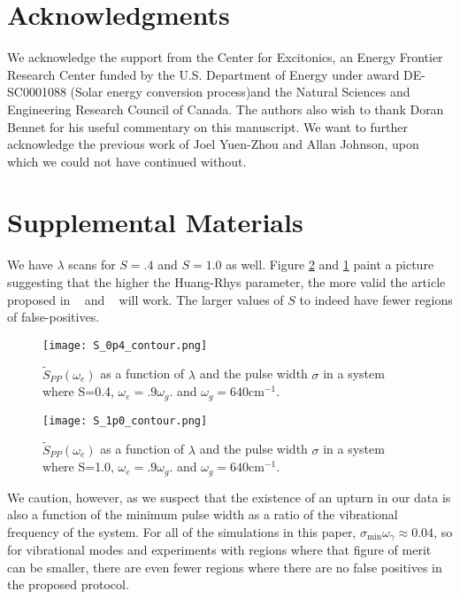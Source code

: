 


\section{Acknowledgments}
We acknowledge the support from the Center for Excitonics, an Energy Frontier Research Center funded by the U.S. Department of Energy under award DE-SC0001088 (Solar energy conversion process)and the Natural Sciences and Engineering Research Council of Canada.  The authors also wish to thank Doran Bennet for his useful commentary on this manuscript.  We want to further acknowledge the previous work of Joel Yuen-Zhou and Allan Johnson, upon which we could not have continued without.



\section{Supplemental Materials}
We have $\lambda$ scans for $S=.4$ and $S=1.0$ as well.  Figure \ref{fig:s_1p0} and \ref{fig:s_0p4} paint a picture suggesting that the higher the Huang-Rhys parameter, the more valid the article proposed in ~\cite{allanWitness} and ~\cite{witness} will work.  The larger values of $S$ to indeed have fewer regions of false-positives.
\begin{figure}
   \texttt{[image: S\_0p4\_contour.png]}
   \caption{$\tilde{S}_{PP} ( \omega_e)$ as a function of $\lambda$ and the pulse width $\sigma$ in a system where S=0.4, $\omega_e = .9 \omega_g$. and $\omega_g = 640 \text{cm}^{-1}$.}
	\label{fig:s_0p4}
\end{figure}

\begin{figure}
   \texttt{[image: S\_1p0\_contour.png]}
   \caption{$\tilde{S}_{PP} ( \omega_e)$ as a function of $\lambda$ and the pulse width $\sigma$ in a system where S=1.0, $\omega_e = .9 \omega_g$. and $\omega_g = 640 \text{cm}^{-1}$. }
	\label{fig:s_1p0}
\end{figure}
We caution, however, as we suspect that the existence of an upturn in our data  is also a function of the minimum pulse width as a ratio of the vibrational frequency of the system.  For all of the simulations in this paper, $\sigma_{\min} \omega_{\gamma} \approx 0.04 $, so for vibrational modes and experiments with regions where that figure of merit can be smaller, there are even fewer regions where there are no false positives in the proposed protocol.
